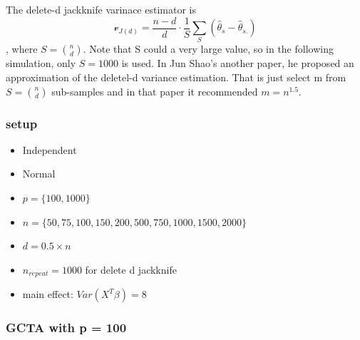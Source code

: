\documentclass[]{article}
\providecommand{\tightlist}{%
  \setlength{\itemsep}{0pt}\setlength{\parskip}{0pt}}
\begin{document}
The delete-d jackknife varinace estimator is \[
\mathcal{v}_{J(d)} = \frac{n-d}{d} \cdot \frac{1}{S}\sum_{S}(\hat{\theta}_s - \hat{\theta}_{s.} )
\], where \(S =\binom{n}{d}\). Note that S could a very large value, so
in the following simulation, only \(S = 1000\) is used. In Jun Shao's
another paper, he proposed an approximation of the deletel-d variance
estimation. That is just select m from \(S =\binom{n}{d}\) sub-samples
and in that paper it recommended \(m = n^{1.5}\).

\subsubsection{setup}\label{setup-1}

\begin{itemize}
\tightlist
\item
  Independent
\item
  Normal
\item
  \(p = \{100, 1000\}\)
\item
  \(n = \{50, 75,100, 150, 200, 500, 750,1000, 1500, 2000\}\)
\item
  \(d = 0.5 \times n\)
\item
  \(n_{repeat} = 1000\) for delete d jackknife
\item
  main effect: \(Var(X^T\beta) = 8\)
\end{itemize}

\newpage

\subsubsection{GCTA with p = 100}\label{gcta-with-p-100}

\begingroup\fontsize{7}{9}\selectfont
\end{document}
